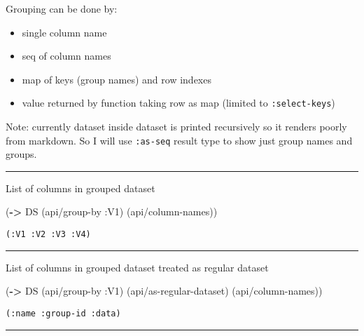 \documentclass[]{article}
\newenvironment{Shaded}{\begin{snugshade}}{\end{snugshade}}
\newcommand{\KeywordTok}[1]{\textcolor[rgb]{0.13,0.29,0.53}{\textbf{#1}}}
\newcommand{\AttributeTok}[1]{\textcolor[rgb]{0.77,0.63,0.00}{#1}}
\newcommand{\NormalTok}[1]{#1}
\providecommand{\tightlist}{%
  \setlength{\itemsep}{0pt}\setlength{\parskip}{0pt}}
\begin{document}
Grouping can be done by:

\begin{itemize}
\tightlist
\item
  single column name
\item
  seq of column names
\item
  map of keys (group names) and row indexes
\item
  value returned by function taking row as map (limited to
  \texttt{:select-keys})
\end{itemize}

Note: currently dataset inside dataset is printed recursively so it
renders poorly from markdown. So I will use \texttt{:as-seq} result type
to show just group names and groups.

\begin{center}\rule{0.5\linewidth}{0.5pt}\end{center}

List of columns in grouped dataset

\begin{Shaded}
\begin{Highlighting}[]
\NormalTok{(}\KeywordTok{->}\NormalTok{ DS}
\NormalTok{    (api/group-by }\AttributeTok{:V1}\NormalTok{)}
\NormalTok{    (api/column-names))}
\end{Highlighting}
\end{Shaded}

\begin{verbatim}
(:V1 :V2 :V3 :V4)
\end{verbatim}

\begin{center}\rule{0.5\linewidth}{0.5pt}\end{center}

List of columns in grouped dataset treated as regular dataset

\begin{Shaded}
\begin{Highlighting}[]
\NormalTok{(}\KeywordTok{->}\NormalTok{ DS}
\NormalTok{    (api/group-by }\AttributeTok{:V1}\NormalTok{)}
\NormalTok{    (api/as-regular-dataset)}
\NormalTok{    (api/column-names))}
\end{Highlighting}
\end{Shaded}

\begin{verbatim}
(:name :group-id :data)
\end{verbatim}

\begin{center}\rule{0.5\linewidth}{0.5pt}\end{center}
\end{document}

